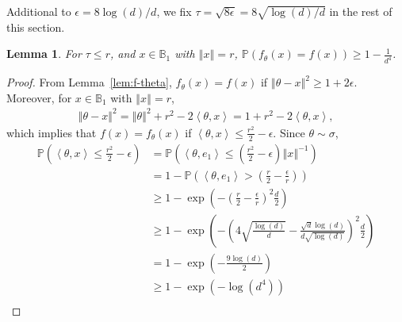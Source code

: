 \documentclass[letter, 12pt]{report}
\newcommand{\ip}[1]{\left \langle #1 \right \rangle}
\newcommand{\ball}{\mathbb{B}}
\newcommand{\paren}[1]{\left( #1 \right)}
\newcommand{\norm}[1]{\left \Vert  #1 \right \Vert}
\newcommand{\1}{\mathbf{1}}
\newcommand{\mP}{\mathbb{P}}
\theoremstyle{plain}
\newtheorem{lemma}[theorem]{Lemma}
\theoremstyle{definition}
\theoremstyle{remark}
\begin{document}
Additional to $\epsilon=8\log(d)/d$, we fix $\tau = \sqrt{8\epsilon} = 8\sqrt{\log(d)/d}$ in the rest of this section.
\begin{lemma}{\label{lem:inf-lower-large-r}}
    For $\tau \leq r$, and $x \in \mathbb{B}_1$
    with $\norm{x} = r$,
    $\displaystyle \mP\paren{
            f_\theta(x) = f(x)
        }
        \geq 1 - \frac{1}{d^4}$.
\end{lemma}
\begin{proof}
    From Lemma~\ref{lem:f-theta},
    $f_\theta(x) = f(x)$ if $\norm{\theta - x}^2 \geq 1 + 2\epsilon$.
    Moreover, for $x \in \ball_1$ with $\norm{x} = r$,
    \begin{align*}
        \norm{\theta - x}^2
        = \norm{\theta}^2 + r^2 - 2\ip{\theta, x}
        = 1 + r^2 - 2\ip{\theta, x},
    \end{align*}
    which implies that $f(x) = f_\theta(x)$ if $\ip{\theta, x} \leq \frac{r^2}{2} - \epsilon$.
    Since $\theta \sim \sigma$,
    \begin{align*}
        \mP\paren{
            \ip{\theta, x} \leq \frac{r^2}{2} - \epsilon
        }
         & =
        \mP\paren{
            \ip{\theta, e_1} \leq \paren{\frac{r^2}{2} - \epsilon}\norm{x}^{-1}
        }
        \\
         & =
        1 -
        \mP\paren{
            \ip{\theta, e_1} > \paren{\frac{r}{2} - \frac{\epsilon}{r}}
        }
        \\
         & \geq
        1
        -
        \exp\paren{
            -
            \paren{\frac{r}{2} - \frac{\epsilon}{r}}^2
            \frac{d}{2}
        }
        \\
         & \geq
        1
        -
        \exp\paren{
            -
            \paren{
                4\sqrt{\frac{\log(d)}{d}}
                -
                \frac{\sqrt{d}\log(d)}{d\sqrt{\log(d)}}
            }^2
            \frac{d}{2}
        }
        \\
         & =
        1
        -
        \exp
        \paren{
            -
            \frac{9\log(d)}{2}
        }
        \\
         & \geq
        1
        -
        \exp
        \paren{-\log(d^{4})}
        \\

\end{align*}
\end{proof}
\end{document}
